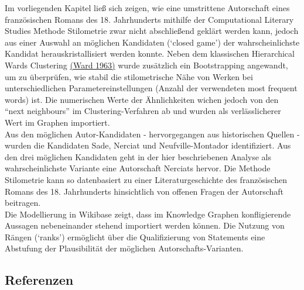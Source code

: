 \documentclass[
  letterpaper,
  DIV=11,
  numbers=noendperiod]{scrreprt}
\begin{document}
Im vorliegenden Kapitel ließ sich zeigen, wie eine umstrittene
Autorschaft eines französischen Romans des 18. Jahrhunderts mithilfe der
Computational Literary Studies Methode Stilometrie zwar nicht
abschließend geklärt werden kann, jedoch aus einer Auswahl an möglichen
Kandidaten (`closed game') der wahrscheinlichste Kandidat
herauskristallisiert werden konnte. Neben dem klassischen Hierarchical
Wards Clustering \href{https://www.zotero.org/google-docs/?Y9OKCB}{(Ward
1963)} wurde zusätzlich ein Bootstrapping angewandt, um zu überprüfen,
wie stabil die stilometrische Nähe von Werken bei unterschiedlichen
Parametereinstellungen (Anzahl der verwendeten most frequent words) ist.
Die numerischen Werte der Ähnlichkeiten wichen jedoch von den ``next
neighbours'' im Clustering-Verfahren ab und wurden als verlässlicherer
Wert im Graphen importiert.\\
Aus den möglichen Autor-Kandidaten - hervorgegangen aus historischen
Quellen - wurden die Kandidaten Sade, Nerciat und Neufville-Montador
identifiziert. Aus den drei möglichen Kandidaten geht in der hier
beschriebenen Analyse als wahrscheinlichste Variante eine Autorschaft
Nerciats hervor. Die Methode Stilometrie kann so datenbasiert zu einer
Literaturgeschichte des französischen Romans des 18. Jahrhunderts
hinsichtlich von offenen Fragen der Autorschaft beitragen.\\
Die Modellierung in Wikibase zeigt, dass im Knowledge Graphen
konfligierende Aussagen nebeneinander stehend importiert werden können.
Die Nutzung von Rängen (`ranks') ermöglicht über die Qualifizierung von
Statements eine Abstufung der Plausibilität der möglichen
Autorschafts-Varianten.

\subsection{Referenzen}\label{referenzen}
\end{document}

